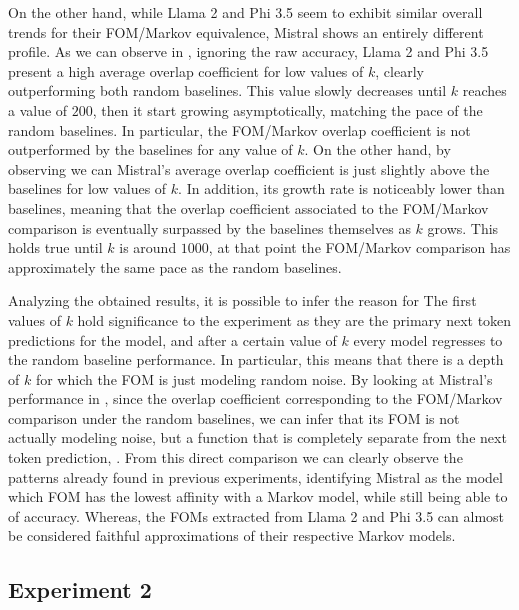 On the other hand,  while Llama 2 and Phi 3.5 seem to exhibit similar overall trends for their FOM/Markov equivalence, Mistral shows an entirely different profile.
As we can observe in , ignoring the raw accuracy, Llama 2 and Phi 3.5 present a high average overlap coefficient for low values of $k$, clearly outperforming both random baselines.
This value slowly decreases until $k$ reaches a value  of $200$, then it start growing asymptotically, matching the pace of the random baselines.
In particular, the FOM/Markov overlap coefficient is not outperformed by the baselines for any value of $k$.
On the other hand, by observing  we can Mistral's average overlap coefficient is just slightly above the baselines for low values of $k$.
In addition, its growth rate is noticeably lower than  baselines, meaning that the overlap coefficient associated to the FOM/Markov comparison is eventually surpassed by the baselines themselves as $k$ grows.
This holds true until $k$ is around $1000$, at that point the FOM/Markov comparison has approximately the same pace as the random baselines.

Analyzing the obtained results, it is possible to infer the reason for 
The first values of $k$ hold  significance to the experiment as they are the primary next token predictions for the model, and after a certain value of $k$ every model regresses to the random baseline performance.
In particular, this means that there is a depth of $k$ for which the FOM is just modeling random noise.
By looking at Mistral's performance in , since the overlap coefficient corresponding to the FOM/Markov comparison  under the random baselines, we can infer that its FOM is not actually modeling noise, but a function that is completely separate from the next token prediction, .
From this direct comparison we can clearly observe the patterns already found in previous experiments, identifying Mistral as the model which FOM has the lowest affinity with a Markov model, while still being able to  of accuracy.
Whereas, the FOMs extracted from Llama 2 and Phi 3.5 can almost be considered faithful approximations of their respective Markov models.

\subsection{Experiment 2}

